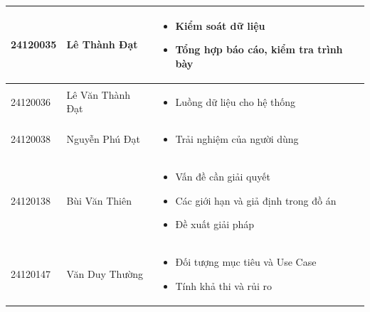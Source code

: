 \begin{table}[H]
\begin{tabularx}{\textwidth}{|p{2cm}|p{4cm}|X|}
        24120035 & Lê Thành Đạt & 
        \vspace{-0.5\baselineskip}
        \begin{itemize}[itemsep=0pt, topsep=0pt, partopsep=0pt, parsep=0pt]
            \item Kiểm soát dữ liệu
            \item Tổng hợp báo cáo, kiểm tra trình bày
        \end{itemize} \\ \hline

        24120036 & Lê Văn Thành Đạt &
        \vspace{-0.5\baselineskip}
        \begin{itemize}[itemsep=0pt, topsep=0pt, partopsep=0pt, parsep=0pt]
            \item Luồng dữ liệu cho hệ thống
        \end{itemize} \\ \hline

        24120038 & Nguyễn Phú Đạt &
        \vspace{-0.5\baselineskip}
        \begin{itemize}[itemsep=0pt, topsep=0pt, partopsep=0pt, parsep=0pt]
            \item Trải nghiệm của người dùng
        \end{itemize} \\ \hline

        24120138 & Bùi Văn Thiên &
        \vspace{-0.5\baselineskip}
        \begin{itemize}[itemsep=0pt, topsep=0pt, partopsep=0pt, parsep=0pt]
            \item Vấn đề cần giải quyết
            \item Các giới hạn và giả định trong đồ án
            \item Đề xuất giải pháp
        \end{itemize} \\ \hline

        24120147 & Văn Duy Thường &
        \vspace{-0.5\baselineskip}
        \begin{itemize}[itemsep=0pt, topsep=0pt, partopsep=0pt, parsep=0pt]
            \item Đối tượng mục tiêu và Use Case
            \item Tính khả thi và rủi ro
        \end{itemize} \\ \hline
    \end{tabularx}
\end{table}
